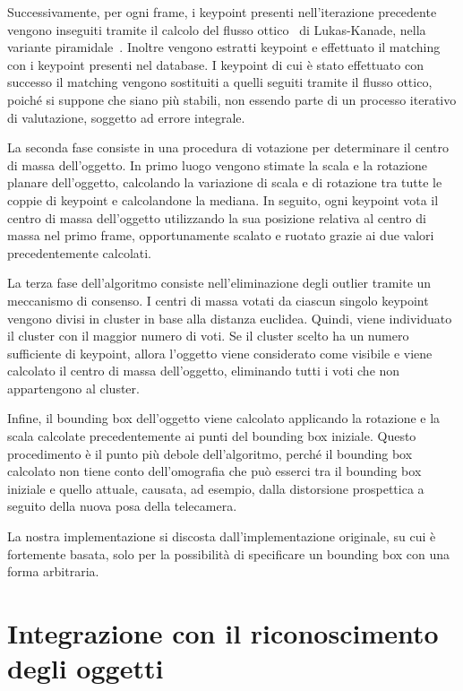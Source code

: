 Successivamente, per ogni frame, i keypoint presenti nell'iterazione precedente vengono inseguiti tramite il calcolo del flusso ottico~\cite{Lucas:1981:IIR:1623264.1623280} di Lukas-Kanade, nella variante piramidale~\cite{Bouguet00pyramidalimplementation}. Inoltre vengono estratti keypoint e effettuato il matching con i keypoint presenti nel database. I keypoint di cui è stato effettuato con successo il matching vengono sostituiti a quelli seguiti tramite il flusso ottico, poiché si suppone che siano più stabili, non essendo parte di un processo iterativo di valutazione, soggetto ad errore integrale.

La seconda fase consiste in una procedura di votazione per determinare il centro di massa dell'oggetto.
In primo luogo vengono stimate la scala e la rotazione planare dell'oggetto, calcolando la variazione di scala e di rotazione tra tutte le coppie di keypoint e calcolandone la mediana. In seguito, ogni keypoint vota il centro di massa dell'oggetto utilizzando la sua posizione relativa al centro di massa nel primo frame, opportunamente scalato e ruotato grazie ai due valori precedentemente calcolati.

La terza fase dell'algoritmo consiste nell'eliminazione degli outlier tramite un meccanismo di consenso. I centri di massa votati da ciascun singolo keypoint vengono divisi in cluster in base alla distanza euclidea. Quindi, viene individuato il cluster con il maggior numero di voti. Se il cluster scelto ha un numero sufficiente di keypoint, allora l'oggetto viene considerato come visibile e viene calcolato il centro di massa dell'oggetto, eliminando tutti i voti che non appartengono al cluster.

Infine, il bounding box dell'oggetto viene calcolato applicando la rotazione e la scala calcolate precedentemente ai punti del bounding box iniziale. Questo procedimento è il punto più debole dell'algoritmo, perché il bounding box calcolato non tiene conto dell'omografia che può esserci tra il bounding box iniziale e quello attuale, causata, ad esempio, dalla distorsione prospettica a seguito della nuova posa della telecamera.

La nostra implementazione si discosta dall'implementazione originale, su cui è fortemente basata, solo per la possibilità di specificare un bounding box con una forma arbitraria.

\section{Integrazione con il riconoscimento degli oggetti}


